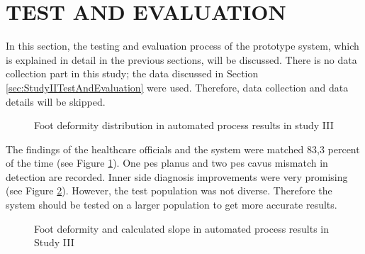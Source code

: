 \section{TEST AND EVALUATION}\label{sec:StudyIIITestAndEvaluation}

In this section, the testing and evaluation process of the prototype system, which is explained in detail in the previous sections, will be discussed. There is no data collection part in this study; the data discussed in Section \ref{sec:StudyIITestAndEvaluation} were used. Therefore, data collection and data details will be skipped.

\begin{figure}[htbp]
\centering
{}
\caption{Foot deformity distribution in automated process results in study III}
\label{fig:StudyIIIFootDeformityAutomatedProcessResults}
\end{figure} 

The findings of the healthcare officials and the system were matched 83,3 percent of the time (see Figure \ref{fig:StudyIIIFootDeformityAutomatedProcessResults}). One pes planus and two pes cavus mismatch in detection are recorded. Inner side diagnosis improvements were very promising (see Figure \ref{fig:StudyIIISlopeResults}). However, the test population was not diverse. Therefore the system should be tested on a larger population to get more accurate results.

\begin{figure}[htbp]
\centering
{}
\caption{Foot deformity and calculated slope in automated process results in Study III}
\label{fig:StudyIIISlopeResults}
\end{figure} 

